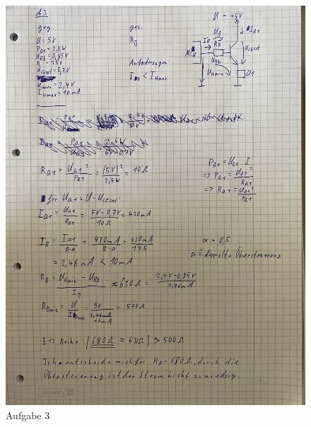 \documentclass{article}
\begin{document}
\clearpage
\begin{figure}
    \centering
    \includegraphics[angle=270, width=\linewidth]{A3.jpg}
    \caption{Aufgabe 3}
\end{figure}
\end{document}
